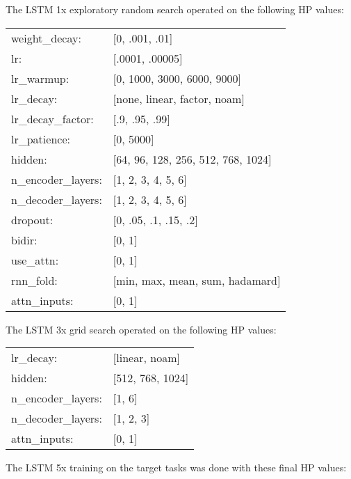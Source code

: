 The LSTM 1x exploratory random search operated on the following HP values:

\begin{tabular}{ll}

    
    weight\_decay: & [0, .001, .01] \\
    lr: & [.0001, .00005] \\
    lr\_warmup: & [0, 1000, 3000, 6000, 9000] \\
    lr\_decay: & [none, linear, factor, noam] \\
    lr\_decay\_factor: & [.9, .95, .99] \\
    lr\_patience: & [0, 5000] \\
    hidden: & [64, 96, 128, 256, 512, 768, 1024] \\
    n\_encoder\_layers: & [1, 2, 3, 4, 5, 6] \\
    n\_decoder\_layers: & [1, 2, 3, 4, 5, 6] \\
    dropout: & [0, .05, .1, .15, .2] \\
    bidir: & [0, 1] \\
    use\_attn: & [0, 1] \\
    rnn\_fold: & [min, max, mean, sum, hadamard] \\
    attn\_inputs: & [0, 1] \\  
\end{tabular}
\vskip 0.15in

The LSTM 3x grid search operated on the following HP values:

\begin{tabular}{ll}
    lr\_decay: & [linear, noam] \\
    hidden: & [512, 768, 1024] \\
    n\_encoder\_layers: & [1, 6] \\
    n\_decoder\_layers: & [1, 2, 3] \\
    attn\_inputs: & [0, 1] \\  
\end{tabular}
\vskip 0.15in

The LSTM 5x training on the target tasks was done with these final HP values:

